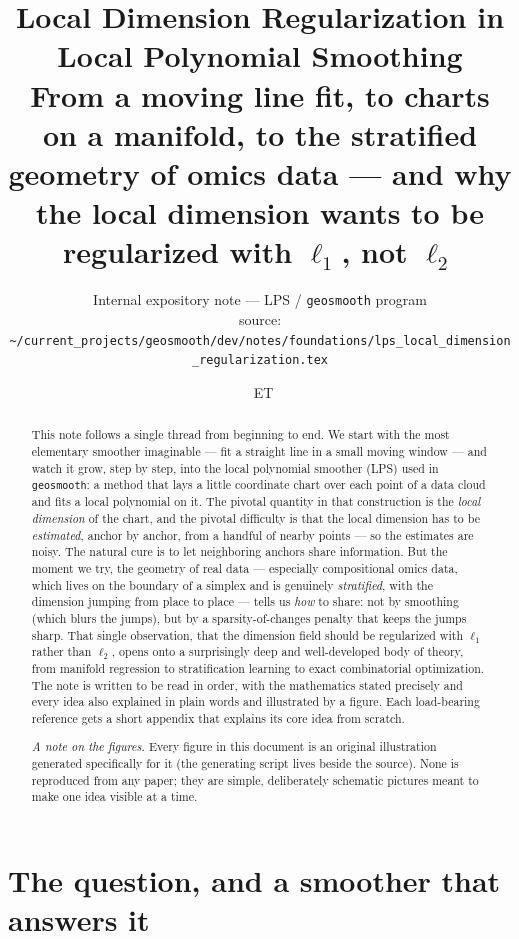 \documentclass[11pt]{article}
\title{\textbf{Local Dimension Regularization in Local Polynomial Smoothing}\\[4pt]
\large From a moving line fit, to charts on a manifold, to the stratified
geometry of omics data --- and why the local dimension wants to be regularized
with $\ell_1$, not $\ell_2$}
\author{\small Internal expository note --- LPS / \texttt{geosmooth} program\\[2pt]
\footnotesize source: \nolinkurl{~/current_projects/geosmooth/dev/notes/foundations/lps_local_dimension_regularization.tex}}
\date{\DTMnow\ \textnormal{\footnotesize ET}}
\theoremstyle{definition}
\theoremstyle{remark}
\begin{document}
\maketitle

\begin{abstract}\noindent
This note follows a single thread from beginning to end. We start with the most
elementary smoother imaginable --- fit a straight line in a small moving window
--- and watch it grow, step by step, into the local polynomial smoother (LPS)
used in \texttt{geosmooth}: a method that lays a little coordinate chart over each
point of a data cloud and fits a local polynomial on it. The pivotal quantity in
that construction is the \emph{local dimension} of the chart, and the pivotal
difficulty is that the local dimension has to be \emph{estimated}, anchor by
anchor, from a handful of nearby points --- so the estimates are noisy. The
natural cure is to let neighboring anchors share information. But the moment we
try, the geometry of real data --- especially compositional omics data, which
lives on the boundary of a simplex and is genuinely \emph{stratified}, with the
dimension jumping from place to place --- tells us \emph{how} to share: not by
smoothing (which blurs the jumps), but by a sparsity-of-changes penalty that
keeps the jumps sharp. That single observation, that the dimension field should
be regularized with $\ell_1$ rather than $\ell_2$, opens onto a surprisingly deep
and well-developed body of theory, from manifold regression to stratification
learning to exact combinatorial optimization. The note is written to be read in
order, with the mathematics stated precisely and every idea also explained in
plain words and illustrated by a figure. Each load-bearing reference gets a
short appendix that explains its core idea from scratch.
\par\medskip\noindent\footnotesize\textit{A note on the figures.} Every figure in
this document is an original illustration generated specifically for it (the
generating script lives beside the source). None is reproduced from any paper;
they are simple, deliberately schematic pictures meant to make one idea visible
at a time.
\end{abstract}

{\small\tableofcontents}

\section{The question, and a smoother that answers it}\label{sec:intro}
\end{document}
